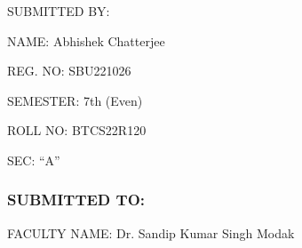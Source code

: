 \documentclass[12pt,a4paper]{article}
\begin{document}
{\huge SUBMITTED BY:  }

{\LARGE NAME: Abhishek Chatterjee }

{\Large REG. NO: SBU221026                                     }

{\Large SEMESTER: 7th (Even)                                         }

{\Large ROLL NO: BTCS22R120 }

{\Large SEC: “A” }

\subsubsection*{SUBMITTED TO: }

{\LARGE FACULTY NAME: Dr. Sandip Kumar Singh Modak }
\end{document}

